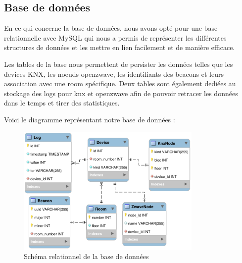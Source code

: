 \subsection{Base de données}
En ce qui concerne la base de données, nous avons opté pour une base relationnelle avec MySQL qui nous a permis de représenter les différentes structures de données et les mettre en lien facilement et de manière efficace.

Les tables de la base nous permettent de persister les données telles que les devices KNX, les noeuds openzwave, les identifiants des beacons et leurs association avec une room spécifique. Deux tables sont également dediées au stockage des logs pour knx et openzwave afin de pouvoir retracer les données dans le temps et tirer des statistiques.

Voici le diagramme représentant notre base de données :


\begin{figure}
    \begin{center}
        \includegraphics[width=0.8\textwidth]{img/diagramme_db.png}
    \end{center}
    \caption{Schéma relationnel de la base de données}
    \label{db_schema}
\end{figure}
